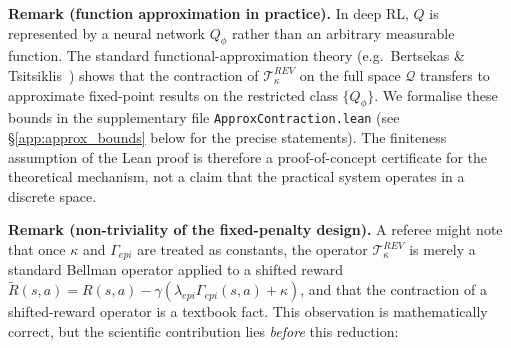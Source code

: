 \textbf{Remark (function approximation in practice).}
In deep RL, $Q$ is represented by a neural network $Q_\phi$ rather than an arbitrary
measurable function.  The standard functional-approximation theory
(e.g.~Bertsekas \& Tsitsiklis~\cite{Bertsekas1996NeuroDynProg}) shows that
the contraction of $\mathcal{T}^{REV}_\kappa$ on the full space $\mathcal{Q}$
transfers to approximate fixed-point results on the restricted class $\{Q_\phi\}$.
We formalise these bounds in the supplementary file \texttt{ApproxContraction.lean}
(see \S\ref{app:approx_bounds} below for the precise statements).
The finiteness assumption of the Lean proof is therefore a proof-of-concept certificate
for the theoretical mechanism, not a claim that the practical system operates
in a discrete space.

\medskip
\textbf{Remark (non-triviality of the fixed-penalty design).}
A referee might note that once $\kappa$ and $\Gamma_{epi}$ are treated as constants, the operator $\mathcal{T}^{REV}_\kappa$ is merely a standard Bellman operator applied to a shifted reward $\tilde{R}(s,a) = R(s,a) - \gamma(\lambda_{epi}\Gamma_{epi}(s,a)+\kappa)$, and that the contraction of a shifted-reward operator is a textbook fact.
This observation is mathematically correct, but the scientific contribution lies \emph{before} this reduction:

